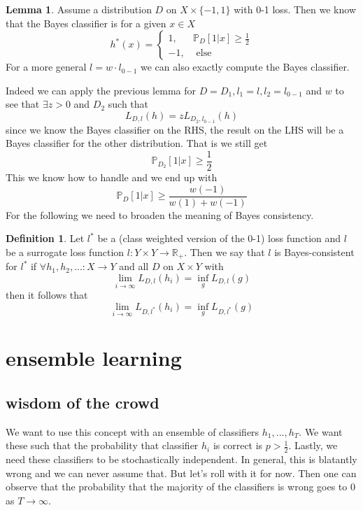 \documentclass[a4paper, 12pt]{article}
\theoremstyle{plain}
\theoremstyle{definition}
\newtheorem{definition}[theorem]{Definition} %
\theoremstyle{lemma}
\newtheorem{lemma}[theorem]{Lemma}
\theoremstyle{remark}
\theoremstyle{example}
\begin{document}
	\begin{lemma}
		Assume a distribution $D$ on $X\times \{-1,1\}$ with 0-1 loss. Then we know that the Bayes classifier is for a given $x\in X$ \[h^*(x) = \begin{cases}
			1,& \mathbb{P}_D[1|x] \geq \frac{1}{2}\\
			-1, & \text{ else}
		\end{cases}\]
		For a more general $l = w\cdot l_{0-1}$ we can also exactly compute the Bayes classifier.
	\end{lemma}
	Indeed we can apply the previous lemma for $D=D_1, l_1 = l, l_2=l_{0-1}$ and $w$ to see that $\exists z>0$ and $D_2$ such that \[L_{D,l}(h) = zL_{D_2,l_{0-1}}(h)\] since we know the Bayes classifier on the RHS, the result on the LHS will be a Bayes classifier for the other distribution. That is we still get \[\mathbb{P}_{D_2}[1|x] \geq \frac{1}{2}\] This we know how to handle and we end up with \[\mathbb{P}_D[1|x] \geq \frac{w(-1)}{w(1)+w(-1)}\]
	For the following we need to broaden the meaning of Bayes consistency. \begin{definition}
		Let $l^*$ be a (class weighted version of the 0-1) loss function and $l$ be a surrogate loss function $l:Y\times Y \to \mathbb{R}_+$. Then we say that $l$ is Bayes-consistent for $l^*$ if $\forall h_1,h_2,...:X \to Y$ and all $D$ on $X\times Y$ with \[\lim_{i \to \infty} L_{D,l}(h_i) = \inf_g L_{D,l}(g)\] then it follows that \[\lim_{i\to \infty} L_{D,l^*}(h_i) = \inf_g L_{D,l^*}(g)\]  
	\end{definition}
	\section{ensemble learning}
	\subsection{wisdom of the crowd}
	We want to use this concept with an ensemble of classifiers $h_1,...,h_T$. We want these such that the probability that classifier $h_i$ is correct is $p>\frac{1}{2}$. Lastly, we need these classifiers to be stochastically independent. In general, this is blatantly wrong and we can never assume that. But let's roll with it for now. Then one can observe that the probability that the majority of the classifiers is wrong goes to 0 as $T\to \infty$.
\end{document}
